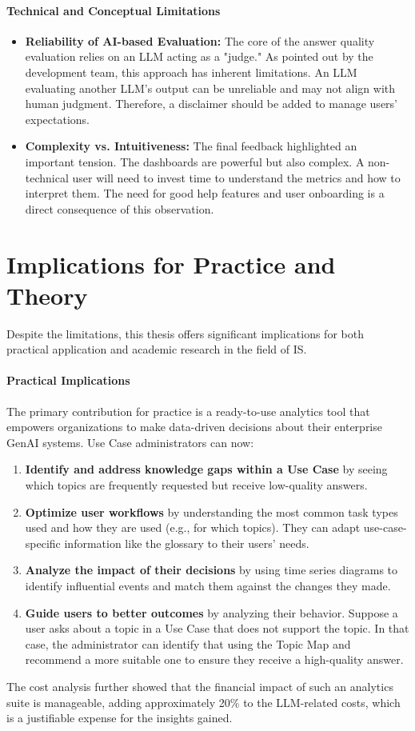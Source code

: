 \documentclass[
	english,
	ruledheaders=section,%
	class=report,%
	thesis={type=bachelor},%
	accentcolor=1b,%
	custommargins=true,%
	marginpar=false,%
	parskip=half-,%
	fontsize=11pt,%
	DIV=14,
]{tudapub}
\begin{document}
\paragraph{Technical and Conceptual Limitations}
\begin{itemize}
    \item \textbf{Reliability of AI-based Evaluation:} The core of the answer quality evaluation relies on an LLM acting as a "judge." As pointed out by the development team, this approach has inherent limitations. An LLM evaluating another LLM's output can be unreliable and may not align with human judgment. Therefore, a disclaimer should be added to manage users' expectations.
    \item \textbf{Complexity vs. Intuitiveness:} The final feedback highlighted an important tension. The dashboards are powerful but also complex. A non-technical user will need to invest time to understand the metrics and how to interpret them. The need for good help features and user onboarding is a direct consequence of this observation.
\end{itemize}
\section{Implications for Practice and Theory}
Despite the limitations, this thesis offers significant implications for both practical application and academic research in the field of IS.

\paragraph{Practical Implications} The primary contribution for practice is a ready-to-use analytics tool that empowers organizations to make data-driven decisions about their enterprise GenAI systems. Use Case administrators can now:
\begin{enumerate}
    \item \textbf{Identify and address knowledge gaps within a Use Case} by seeing which topics are frequently requested but receive low-quality answers.
    \item \textbf{Optimize user workflows} by understanding the most common task types used and how they are used (e.g., for which topics). They can adapt use-case-specific information like the glossary to their users' needs.
    \item \textbf{Analyze the impact of their decisions} by using time series diagrams to identify influential events and match them against the changes they made.
    \item \textbf{Guide users to better outcomes} by analyzing their behavior. Suppose a user asks about a topic in a Use Case that does not support the topic. In that case, the administrator can identify that using the Topic Map and recommend a more suitable one to ensure they receive a high-quality answer.
\end{enumerate}
The cost analysis further showed that the financial impact of such an analytics suite is manageable, adding approximately 20\% to the LLM-related costs, which is a justifiable expense for the insights gained.
\end{document}
